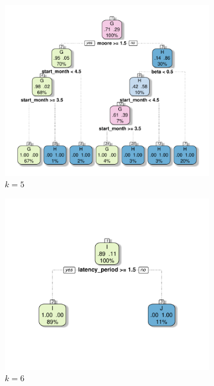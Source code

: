 \documentclass[10pt]{article}
\theoremstyle{definition}
\begin{document}
\begin{figure}[ht]
\begin{subfigure}[b]{.32\textwidth}
\includegraphics[width=\textwidth]{../clustering/results/agglomerative/cart_cGH_agg.pdf}
\caption{$k=5$}
\end{subfigure}
\begin{subfigure}[b]{.32\textwidth}
\includegraphics[width=\textwidth]{../clustering/results/agglomerative/cart_cIJ_agg.pdf}
\caption{$k=6$}
\end{subfigure}
\begin{subfigure}[b]{.32\textwidth}

\end{subfigure}
\end{figure}
\end{document}
